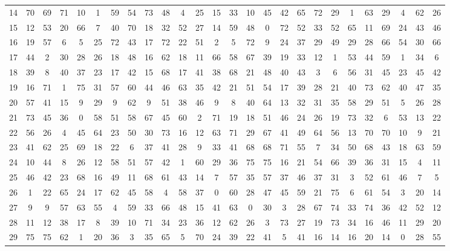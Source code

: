 \begin{table}
\begin{tabular}{c c c c c c c c c c c c c c c c c c c c c c c c c c }
14 & 70 & 69 & 71 & 10 & 1 & 59 & 54 & 73 & 48 & 4 & 25 & 15 & 33 & 10 & 45 & 42 & 65 & 72 & 29 & 1 & 63 & 29 & 4 & 62 & 26 \\
15 & 12 & 53 & 20 & 66 & 7 & 40 & 70 & 18 & 32 & 52 & 27 & 14 & 59 & 48 & 0 & 72 & 52 & 33 & 52 & 65 & 11 & 69 & 24 & 43 & 46 \\
16 & 19 & 57 & 6 & 5 & 25 & 72 & 43 & 17 & 72 & 22 & 51 & 2 & 5 & 72 & 9 & 24 & 37 & 29 & 49 & 29 & 28 & 66 & 54 & 30 & 66 \\
17 & 44 & 2 & 30 & 28 & 26 & 18 & 48 & 16 & 62 & 18 & 11 & 66 & 58 & 67 & 39 & 19 & 33 & 12 & 1 & 53 & 44 & 59 & 1 & 34 & 6 \\
18 & 39 & 8 & 40 & 37 & 23 & 17 & 42 & 15 & 68 & 17 & 41 & 38 & 68 & 21 & 48 & 40 & 43 & 3 & 6 & 56 & 31 & 45 & 23 & 45 & 42 \\
19 & 16 & 71 & 1 & 75 & 31 & 57 & 60 & 44 & 46 & 63 & 35 & 42 & 21 & 51 & 54 & 17 & 39 & 28 & 21 & 40 & 73 & 62 & 40 & 47 & 35 \\
20 & 57 & 41 & 15 & 9 & 29 & 9 & 62 & 9 & 51 & 38 & 46 & 9 & 8 & 40 & 64 & 13 & 32 & 31 & 35 & 58 & 29 & 51 & 5 & 26 & 28 \\
21 & 73 & 45 & 36 & 0 & 58 & 51 & 58 & 67 & 45 & 60 & 2 & 71 & 19 & 18 & 51 & 46 & 24 & 26 & 19 & 73 & 32 & 6 & 53 & 13 & 22 \\
22 & 56 & 26 & 4 & 45 & 64 & 23 & 50 & 30 & 73 & 16 & 12 & 63 & 71 & 29 & 67 & 41 & 49 & 64 & 56 & 13 & 70 & 70 & 10 & 9 & 21 \\
23 & 41 & 62 & 25 & 69 & 18 & 22 & 6 & 37 & 41 & 28 & 9 & 33 & 41 & 68 & 68 & 71 & 55 & 7 & 34 & 50 & 68 & 43 & 18 & 63 & 59 \\
24 & 10 & 44 & 8 & 26 & 12 & 58 & 51 & 57 & 42 & 1 & 60 & 29 & 36 & 75 & 75 & 16 & 21 & 54 & 66 & 39 & 36 & 31 & 15 & 4 & 11 \\
25 & 46 & 42 & 23 & 68 & 16 & 49 & 11 & 68 & 61 & 43 & 14 & 7 & 57 & 35 & 57 & 37 & 46 & 37 & 31 & 3 & 52 & 61 & 46 & 7 & 5 \\
26 & 1 & 22 & 65 & 24 & 17 & 62 & 45 & 58 & 4 & 58 & 37 & 0 & 60 & 28 & 47 & 45 & 59 & 21 & 75 & 6 & 61 & 54 & 3 & 20 & 14 \\
27 & 9 & 9 & 57 & 63 & 55 & 4 & 59 & 33 & 66 & 48 & 15 & 41 & 63 & 0 & 30 & 3 & 28 & 67 & 74 & 33 & 74 & 36 & 42 & 52 & 12 \\
28 & 11 & 12 & 38 & 17 & 8 & 39 & 10 & 71 & 34 & 23 & 36 & 12 & 62 & 26 & 3 & 73 & 27 & 19 & 73 & 34 & 16 & 46 & 11 & 29 & 20 \\
29 & 75 & 75 & 62 & 1 & 20 & 36 & 3 & 35 & 65 & 5 & 70 & 24 & 39 & 22 & 41 & 5 & 41 & 16 & 14 & 16 & 20 & 14 & 0 & 28 & 55 \\

\end{tabular}
\end{table}
